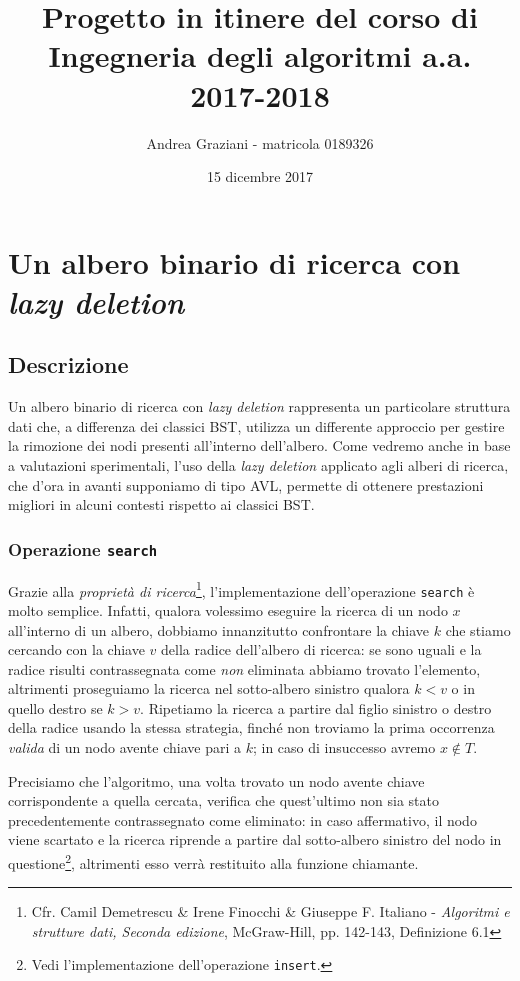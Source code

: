 \documentclass[10pt,a4paper,titlepage]{article}
\title{Progetto in itinere del corso di Ingegneria degli algoritmi a.a. 2017-2018}
\author{Andrea Graziani - matricola 0189326}
\date{15 dicembre 2017}
\begin{document}
\maketitle
\tableofcontents
\newpage


\section{Un albero binario di ricerca con \textit{lazy deletion}}

\subsection{Descrizione}

Un albero binario di ricerca con \textit{lazy deletion} rappresenta un particolare struttura dati che, a differenza dei classici BST, utilizza un differente approccio per gestire la rimozione dei nodi presenti all'interno dell'albero. Come vedremo anche in base a valutazioni sperimentali, l'uso della \textit{lazy deletion} applicato agli alberi di ricerca, che d'ora in avanti supponiamo di tipo AVL, permette di ottenere prestazioni migliori in alcuni contesti rispetto ai classici BST. 

\subsubsection{Operazione \texttt{search}}

Grazie alla \textit{proprietà di ricerca}\footnote{Cfr. Camil Demetrescu \& Irene Finocchi \& Giuseppe F. Italiano - \textit{Algoritmi e strutture dati, Seconda edizione}, McGraw-Hill, pp. 142-143, Definizione 6.1}, l'implementazione dell'operazione \texttt{search} è molto semplice. Infatti, qualora volessimo eseguire la ricerca di un nodo $x$ all'interno di un albero, dobbiamo innanzitutto confrontare la chiave $k$ che stiamo cercando con la chiave $v$ della radice dell'albero di ricerca: se sono uguali e la radice risulti contrassegnata come \textit{non} eliminata abbiamo trovato l'elemento, altrimenti proseguiamo la ricerca nel sotto-albero sinistro qualora $k < v$ o in quello destro se $k > v$. Ripetiamo la ricerca a partire dal figlio sinistro o destro della radice usando la stessa strategia, finché non troviamo la prima occorrenza \textit{valida} di un nodo avente chiave pari a $k$; in caso di insuccesso avremo $x \notin T$.

Precisiamo che l'algoritmo, una volta trovato un nodo avente chiave corrispondente a quella cercata, verifica che quest'ultimo non sia stato precedentemente contrassegnato come eliminato: in caso affermativo, il nodo viene scartato e la ricerca riprende a partire dal sotto-albero sinistro del nodo in questione\footnote{Vedi l'implementazione dell'operazione \texttt{insert}.}, altrimenti esso verrà restituito alla funzione chiamante.
\end{document}
